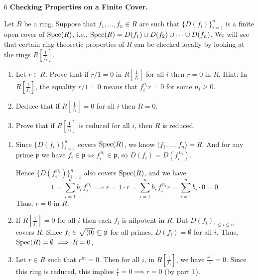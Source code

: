 \documentclass[Notebook.tex]{subfiles}
\begin{document}
\begin{problem}{6}
    \textbf{Checking Properties on a Finite Cover.} 
    
    Let $R$ be a ring. Suppose that $f_1,\ldots,f_n \in R$ are such that $\{D(f_i)\}_{i=1}^{n}$ is a finite open cover of $\operatorname{Spec}(R)$, i.e., $\operatorname{Spec}(R)=D(f_1)\cup D(f_2)\cup \cdots \cup D(f_n)$. We will see that certain ring-theoretic properties of $R$ can be checked locally by looking at the rings $R[\frac{1}{f_i}]$.
    \begin{enumerate}
        \item Let $r \in R$. Prove that if $r/1=0$ in $R[\frac{1}{f_i}]$ for all $i$ then $r=0$ in $R$. Hint: In $R[\frac{1}{f_i}]$, the equality $r/1=0$ means that $f_i^{n_i}r=0$ for some $n_i\ge 0$.
        \item Deduce that if  $R[\frac{1}{f_i}]=0$ for all $i$ then $R=0$. 
        \item Prove that if $R[\frac{1}{f_i}]$ is reduced for all $i$, then $R$ is reduced. 
    \end{enumerate}
\end{problem}

\begin{solution}
    \bbni
    \begin{enumerate}
        \item 

        Since $\{D(f_i)\}_{i=1}^n$ covers $\operatorname{Spec}(R)$, we know
        $\langle f_1, \ldots, f_n\rangle = R$. And for any prime $\mathfrak{p}$ we have $f_i \in \mathfrak{p} \iff f_i^{\,n_i} \in \mathfrak{p}$, so $D(f_i) = D(f_i^{\,n_i})$.

        Hence $\{D(f_i^{\,n_i})\}_{i=1}^n$ also covers $\operatorname{Spec}(R)$, and we have
        \[
        1 = \sum_{i=1}^{n} b_i\, f_i^{\,n_i} \implies 
        r = 1 \cdot r = \sum_{i=1}^{n} b_i\, f_i^{\,n_i} r = \sum_{i=1}^{n} b_i \cdot 0 = 0.
        \]
        Thus, $r = 0$ in $R$.

        \item If $R[\frac{1}{f_i}]=0$ for all $i$ then each $f_i$ is nilpotent in $R$. But ${D(f_i)}_{1 \leq i \leq n}$ covers $R$. Since $f_i \in \sqrt{\langle 0 \rangle} \subseteq \operatorname{\mathfrak{p}}$ for all primes, $D(f_i) = \emptyset$ for all $i$. Thus, $\operatorname{Spec}(R) = \emptyset \implies R =0$. 
        
        \item Let $r \in R$ such that $r^m = 0$. Then for all $i$, in $R[\frac{1}{f_i}]$, we have $\frac{r^m}{1} = 0$. Since this ring is reduced, this implies $\frac{r}{1}= 0 \implies r = 0$ (by part 1).
    \end{enumerate}
\end{solution}
\end{document}
